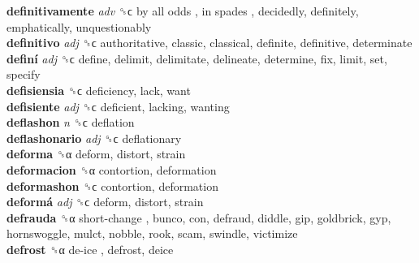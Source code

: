 \textbf{definitivamente} \emph{adv}  ␝ϲ   by all odds ,  in spades , decidedly, definitely, emphatically, unquestionably  \\
\textbf{definitivo} \emph{adj}  ␝ϲ  authoritative, classic, classical, definite, definitive, determinate  \\
\textbf{definí} \emph{adj}  ␝ϲ  define, delimit, delimitate, delineate, determine, fix, limit, set, specify  \\
\textbf{defisiensia} ␝ϲ  deficiency, lack, want  \\
\textbf{defisiente} \emph{adj}  ␝ϲ  deficient, lacking, wanting  \\
\textbf{deflashon} \emph{n}  ␝ϲ  deflation  \\
\textbf{deflashonario} \emph{adj}  ␝ϲ  deflationary  \\
\textbf{deforma} ␝α  deform, distort, strain  \\
\textbf{deformacion} ␝α  contortion, deformation  \\
\textbf{deformashon} ␝ϲ  contortion, deformation  \\
\textbf{deformá} \emph{adj}  ␝ϲ  deform, distort, strain  \\
\textbf{defrauda} ␝α   short-change , bunco, con, defraud, diddle, gip, goldbrick, gyp, hornswoggle, mulct, nobble, rook, scam, swindle, victimize  \\
\textbf{defrost} ␝α   de-ice , defrost, deice  \\
